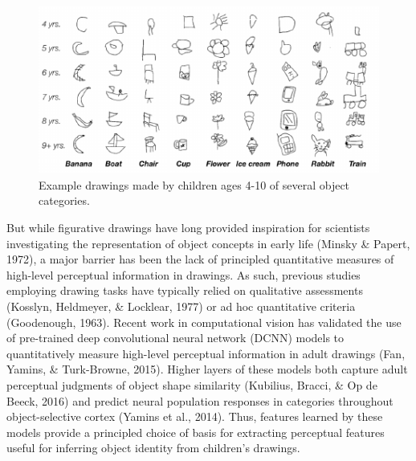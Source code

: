\documentclass[10pt, letterpaper]{article}
\newenvironment{CodeChunk}{}{}
\begin{document}
\begin{CodeChunk}
\begin{figure}[h]

{\centering \includegraphics[width=1\linewidth]{figs/exampleDrawings-1} 

}

\caption[Example drawings made by children ages 4-10 of several object categories]{Example drawings made by children ages 4-10 of several object categories.}\label{fig:exampleDrawings}
\end{figure}
\end{CodeChunk}

But while figurative drawings have long provided inspiration for
scientists investigating the representation of object concepts in early
life (Minsky \& Papert, 1972), a major barrier has been the lack of
principled quantitative measures of high-level perceptual information in
drawings. As such, previous studies employing drawing tasks have
typically relied on qualitative assessments (Kosslyn, Heldmeyer, \&
Locklear, 1977) or ad hoc quantitative criteria (Goodenough, 1963).
Recent work in computational vision has validated the use of pre-trained
deep convolutional neural network (DCNN) models to quantitatively
measure high-level perceptual information in adult drawings (Fan,
Yamins, \& Turk-Browne, 2015). Higher layers of these models both
capture adult perceptual judgments of object shape similarity (Kubilius,
Bracci, \& Op de Beeck, 2016) and predict neural population responses in
categories throughout object-selective cortex (Yamins et al., 2014).
Thus, features learned by these models provide a principled choice of
basis for extracting perceptual features useful for inferring object
identity from children's drawings.
\end{document}
